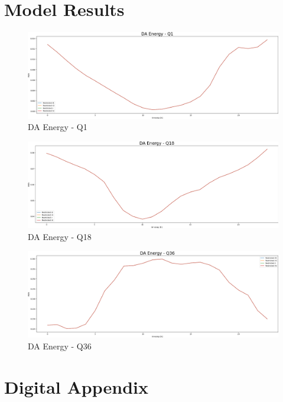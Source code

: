 \section{Model Results}

\begin{figure}[H]
	\includegraphics[width=1\linewidth]{pictures/results/DA Energy - Q1.png}
	\caption{DA Energy - Q1}
	\label{fig:DA Energy - Q1}
\end{figure}

\begin{figure}[H]
	\includegraphics[width=1\linewidth]{pictures/results/DA Energy - Q18.png}
	\caption{DA Energy - Q18}
	\label{fig:DA Energy - Q18}
\end{figure}

\begin{figure}[H]
	\includegraphics[width=1\linewidth]{pictures/results/DA Energy - Q36.png}
	\caption{DA Energy - Q36}
	\label{fig:DA Energy - Q36}
\end{figure}


\section{Digital Appendix}

